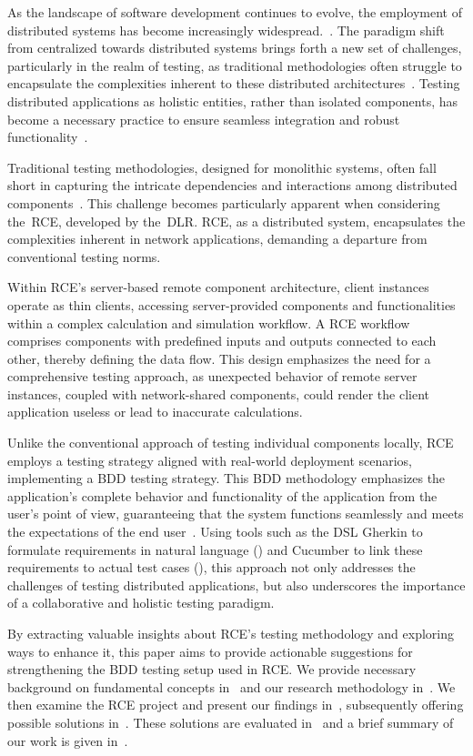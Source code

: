 As the landscape of software development continues to evolve, the employment of distributed systems has become increasingly widespread.~\cite{Xingang2018,Feldman1978}. The paradigm shift from centralized towards distributed systems brings forth a new set of challenges, particularly in the realm of testing, as traditional methodologies often struggle to encapsulate the complexities inherent to these distributed architectures~\cite{Liu,Lima2017}. Testing distributed applications as holistic entities, rather than isolated components, has become a necessary practice to ensure seamless integration and robust functionality~\cite{Liu,Lima2017}.

Traditional testing methodologies, designed for monolithic systems, often fall short in capturing the intricate dependencies and interactions among distributed components~\cite{Liu,Lima2017}. This challenge becomes particularly apparent when considering the~\acf{RCE}, developed by the~\acf{DLR}. \ac{RCE}, as a distributed system, encapsulates the complexities inherent in network applications, demanding a departure from conventional testing norms.

Within \ac{RCE}'s server-based remote component architecture, client instances operate as thin clients, accessing server-provided components and functionalities within a complex calculation and simulation workflow. A \ac{RCE} workflow comprises components with predefined inputs and outputs connected to each other, thereby defining the data flow. This design emphasizes the need for a comprehensive testing approach, as unexpected behavior of remote server instances, coupled with network-shared components, could render the client application useless or lead to inaccurate calculations.

Unlike the conventional approach of testing individual components locally, \ac{RCE} employs a testing strategy aligned with real-world deployment scenarios, implementing a \acf{BDD} testing strategy. This \ac{BDD} methodology emphasizes the application's complete behavior and functionality of the application from the user's point of view, guaranteeing that the system functions seamlessly and meets the expectations of the end user~\cite{wynne2012cucumber}. Using tools such as the \ac{DSL} Gherkin to formulate requirements in natural language () and Cucumber to link these requirements to actual test cases (), this approach not only addresses the challenges of testing distributed applications, but also underscores the importance of a collaborative and holistic testing paradigm.

By extracting valuable insights about \ac{RCE}'s testing methodology and exploring ways to enhance it, this paper aims to provide actionable suggestions for strengthening the \ac{BDD} testing setup used in \ac{RCE}. We provide necessary background on fundamental concepts in~ and our research methodology in~. We then examine the \ac{RCE} project and present our findings in~, subsequently offering possible solutions in~. These solutions are evaluated in~ and a brief summary of our work is given in~.